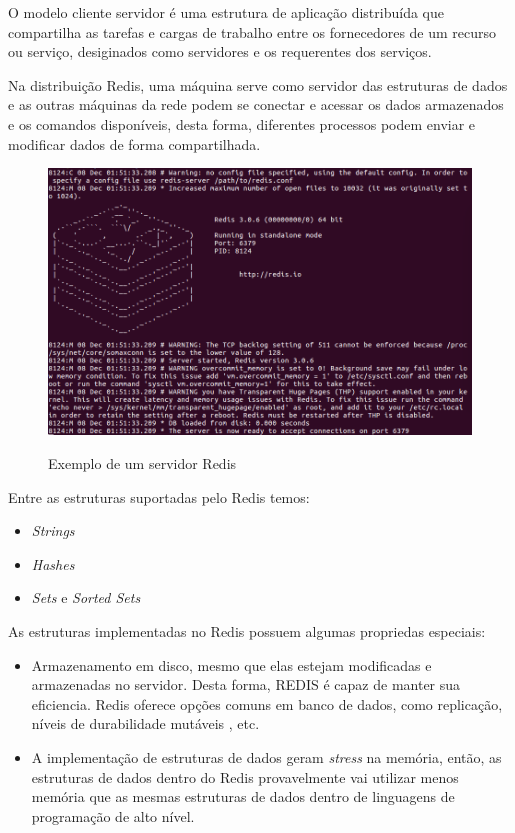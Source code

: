 \documentclass[10pt]{IEEEtran}
\begin{document}
O modelo cliente servidor é uma estrutura de aplicação distribuída que compartilha as tarefas e cargas de trabalho entre os fornecedores de um recurso ou serviço, desiginados como servidores e os requerentes dos serviços.

Na distribuição Redis, uma máquina serve como servidor das estruturas de dados e as outras máquinas da rede podem se conectar e acessar os dados armazenados e os comandos disponíveis, desta forma, diferentes processos podem enviar e modificar dados de forma compartilhada.


\begin{figure}
	\includegraphics[scale=0.35]{server.png}
	\label{fig:server}
    \caption{Exemplo de um servidor Redis}
\end{figure}

Entre as estruturas suportadas pelo Redis temos:
\begin{itemize}
\item \textit{Strings}
\item \textit{Hashes}
\item \textit{Sets} e \textit{Sorted Sets}
\end{itemize}

As estruturas implementadas no Redis possuem algumas propriedas especiais:
\begin{itemize}
\item Armazenamento em disco, mesmo que elas estejam modificadas e armazenadas no servidor. Desta forma, REDIS é capaz de manter sua eficiencia.
Redis oferece opções comuns em banco de dados, como replicação, níveis de durabilidade mutáveis , etc.

\item A implementação de estruturas de dados geram \textit{stress} na memória, então, as estruturas de dados dentro do Redis provavelmente vai utilizar menos memória que as mesmas estruturas de dados dentro de linguagens de programação de alto nível.
\end{itemize}
\end{document}
